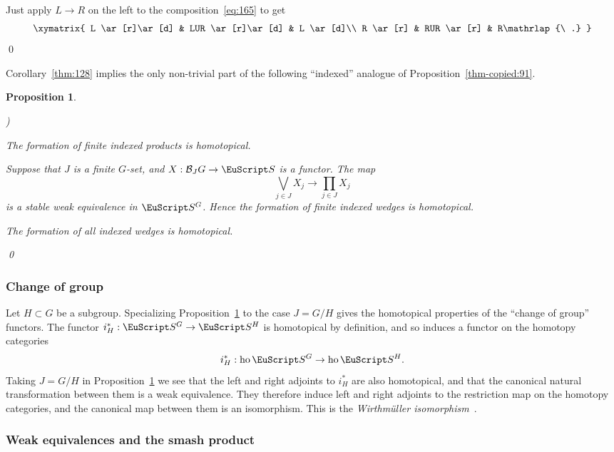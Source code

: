 \documentclass{amsart}
\newtheorem{prop}[equation]{Proposition}
\theoremstyle{definition}
\theoremstyle{remark}
\newenvironment{pf}{\bigskip{\em Proof:\/}}{\qed\medskip}
\newcounter{thmItem}
\newenvironment{thmList}{\begin{list}%
{\rm \roman{thmItem})}{\usecounter{thmItem}
\setlength{\labelwidth}{2em}
\setlength{\itemindent}{2em}
\setlength{\leftmargin}{0pt}
\setlength{\listparindent}{0pt}
\setlength{\parsep}{0pt}
\setlength{\partopsep}{0pt}
\setlength{\itemsep}{\medskipamount}
\setlength{\topsep}{\medskipamount}
}}{\end{list}}
\newcommand{\spectra}{\EuScript S}
\DeclareMathOperator{\ho}{ho}
\newcommand{\ugspectra}[1]{\spectra^{#1}}
\newcommand{\cat}[1]{{\mathcal #1}}
\begin{document}
\begin{pf}
Just apply $L\to R$ on the left to the composition~\eqref{eq:165} to get
\[
\xymatrix{
L  \ar[r]\ar[d]  & LUR  \ar[r]\ar[d]   & L  \ar[d]\\
R  \ar[r]        & RUR   \ar[r]         &   R\mathrlap{\ .}
}
\]
\end{pf}

Corollary~\ref{thm:128} implies the only non-trivial
part of the following ``indexed'' analogue of
Proposition~\ref{thm-copied:91}.

\begin{prop}
\label{thm-copied:246}
\begin{thmList}
\item\label{part:fip} The formation of finite indexed products is homotopical.
\item\label{part:11} Suppose that $J$ is a finite $G$-set, and $X:\cat{B}_{J}G\to \spectra$
is a functor.   The map 
\[
\bigvee_{j\in J} X_{j} \to \prod_{j\in J} X_{j}
\]
is a stable weak equivalence in $\ugspectra{G}$.   Hence the formation
of finite indexed wedges is homotopical.  
\item\label{part-copied:10} The formation of all indexed wedges is
homotopical. 
\end{thmList}
\qed
\end{prop}


\subsubsection{Change of group}

Let $H\subset G$ be a subgroup.  Specializing
Proposition~\ref{thm-copied:246} to the case $J=G/H$ gives the
homotopical properties of the ``change of group'' functors.  The
functor $i_{H}^{\ast}:\ugspectra{G}\to\ugspectra{H}$ is homotopical by
definition, and so induces a functor on the homotopy categories
\[
i_{H}^{\ast}:\ho\ugspectra{G} \to \ho\ugspectra{H}.
\]
Taking $J=G/H$ in Proposition~\ref{thm-copied:246} we see that the
left and right adjoints to $i_{H}^{\ast}$ are also homotopical, and
that the canonical natural transformation between them is a weak
equivalence.  They therefore induce left and right adjoints to the
restriction map on the homotopy categories, and the canonical map
between them is an isomorphism.  This is the {\em Wirthm\"uller
isomorphism}~\cite{MR0343260,MR764596}.

\subsubsection{Weak equivalences and the smash product}
\label{sec:weak-equiv-smash}
\end{document}
